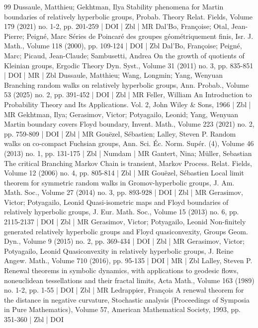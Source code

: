 \documentclass[10pt]{amsart}
\theoremstyle{definition}\newtheorem{defi}[theo]{Definition}\newtheorem{rema}[theo]{Remark}\newtheorem{exam}[theo]{Example}\newtheorem{exem}[theo]{Example}\newtheorem{nota}[theo]{Notation}
\begin{document}
\begin{thebibliography}{99}
 Dussaule, Matthieu; Gekhtman, Ilya Stability phenomena for Martin boundaries of relatively hyperbolic groups, Probab. Theory Relat. Fields, Volume 179 (2021) no. 1-2, pp. 201-259 | DOI | Zbl | MR
 Dal’Bo, Françoise; Otal, Jean-Pierre; Peigné, Marc Séries de Poincaré des groupes géométriquement finis, Isr. J. Math., Volume 118 (2000), pp. 109-124 | DOI | Zbl
 Dal’Bo, Françoise; Peigné, Marc; Picaud, Jean-Claude; Sambusetti, Andrea On the growth of quotients of Kleinian groups, Ergodic Theory Dyn. Syst., Volume 31 (2011) no. 3, pp. 835-851 | DOI | MR | Zbl
 Dussaule, Matthieu; Wang, Longmin; Yang, Wenyuan Branching random walks on relatively hyperbolic groups, Ann. Probab., Volume 53 (2025) no. 2, pp. 391-452 | DOI | Zbl | MR
 Feller, William An Introduction to Probability Theory and Its Applications. Vol. 2, John Wiley \& Sons, 1966 | Zbl | MR
 Gekhtman, Ilya; Gerasimov, Victor; Potyagailo, Leonid; Yang, Wenyuan Martin boundary covers Floyd boundary, Invent. Math., Volume 223 (2021) no. 2, pp. 759-809 | DOI | Zbl | MR
 Gouëzel, Sébastien; Lalley, Steven P. Random walks on co-compact Fuchsian groups, Ann. Sci. Éc. Norm. Supér. (4), Volume 46 (2013) no. 1, pp. 131-175 | Zbl | Numdam | MR
 Gantert, Nina; Müller, Sebastian The critical Branching Markov Chain is transient, Markov Process. Relat. Fields, Volume 12 (2006) no. 4, pp. 805-814 | Zbl | MR
 Gouëzel, Sébastien Local limit theorem for symmetric random walks in Gromov-hyperbolic groups, J. Am. Math. Soc., Volume 27 (2014) no. 3, pp. 893-928 | DOI | Zbl | MR
 Gerasimov, Victor; Potyagailo, Leonid Quasi-isometric maps and Floyd boundaries of relatively hyperbolic groups, J. Eur. Math. Soc., Volume 15 (2013) no. 6, pp. 2115-2137 | DOI | Zbl | MR
 Gerasimov, Victor; Potyagailo, Leonid Non-finitely generated relatively hyperbolic groups and Floyd quasiconvexity, Groups Geom. Dyn., Volume 9 (2015) no. 2, pp. 369-434 | DOI | Zbl | MR
 Gerasimov, Victor; Potyagailo, Leonid Quasiconvexity in relatively hyperbolic groups, J. Reine Angew. Math., Volume 710 (2016), pp. 95-135 | DOI | MR | Zbl
 Lalley, Steven P. Renewal theorems in symbolic dynamics, with applications to geodesic flows, noneuclidean tessellations and their fractal limits, Acta Math., Volume 163 (1989) no. 1-2, pp. 1-55 | DOI | Zbl | MR
 Ledrappier, François A renewal theorem for the distance in negative curvature, Stochastic analysis (Proceedings of Symposia in Pure Mathematics), Volume 57, American Mathematical Society, 1993, pp. 351-360 | Zbl | DOI

\end{thebibliography}
\end{document}

